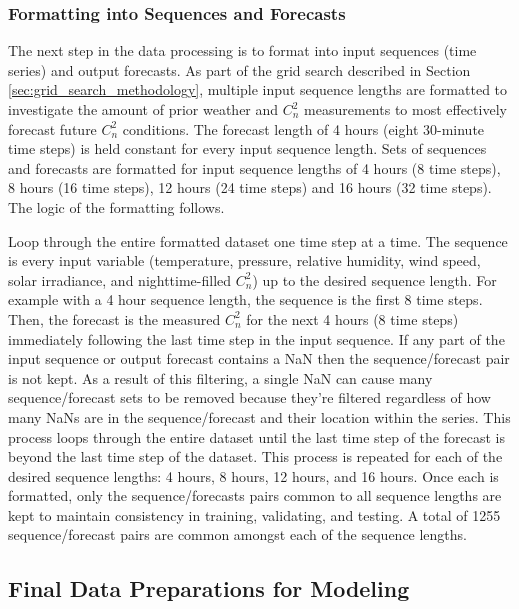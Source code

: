 \subsubsection{Formatting into Sequences and Forecasts}
The next step in the data processing is to format into input sequences (time series) and output forecasts. As part of the grid search described in Section \ref{sec:grid_search_methodology}, multiple input sequence lengths are formatted to investigate the amount of prior weather and $C_{n}^{2}$ measurements to most effectively forecast future $C_{n}^{2}$ conditions. The forecast length of 4 hours (eight 30-minute time steps) is held constant for every input sequence length. Sets of sequences and forecasts are formatted for input sequence lengths of 4 hours (8 time steps), 8 hours (16 time steps), 12 hours (24 time steps) and 16 hours (32 time steps). The logic of the formatting follows.

Loop through the entire formatted dataset one time step at a time. The sequence is every input variable (temperature, pressure, relative humidity, wind speed, solar irradiance, and nighttime-filled $C_{n}^{2}$) up to the desired sequence length. For example with a 4 hour sequence length, the sequence is the first 8 time steps. Then, the forecast is the measured $C_{n}^{2}$ for the next 4 hours (8 time steps) immediately following the last time step in the input sequence. If any part of the input sequence or output forecast contains a \ac{NaN} then the sequence/forecast pair is not kept. As a result of this filtering, a single \ac{NaN} can cause many sequence/forecast sets to be removed because they're filtered regardless of how many \ac{NaN}s are in the sequence/forecast and their location within the series. This process loops through the entire dataset until the last time step of the forecast is beyond the last time step of the dataset. This process is repeated for each of the desired sequence lengths: 4 hours, 8 hours, 12 hours, and 16 hours. Once each is formatted, only the sequence/forecasts pairs common to all sequence lengths are kept to maintain consistency in training, validating, and testing. A total of 1255 sequence/forecast pairs are common amongst each of the sequence lengths.

\subsection{Final Data Preparations for Modeling}

